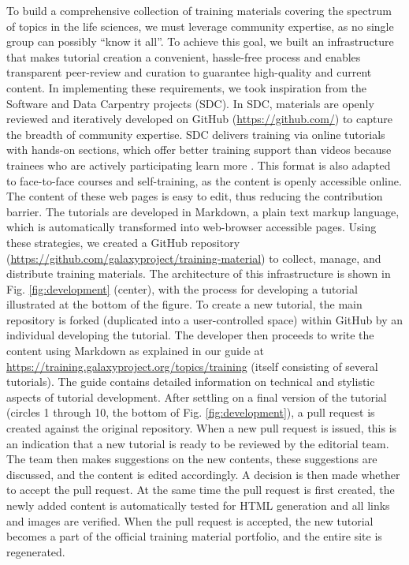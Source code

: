 To build a comprehensive collection of training materials covering the spectrum of topics in the life sciences, we must leverage community expertise, as no single group can possibly “know it all”. To achieve this goal, we built an infrastructure that makes tutorial creation a convenient, hassle-free process and enables transparent peer-review and curation to guarantee high-quality and current content. In implementing these requirements, we took inspiration from the Software and Data Carpentry \cite{wilson2014software} projects (SDC). In SDC, materials are openly reviewed and iteratively developed on GitHub (\url{https://github.com/}) to capture the breadth of community expertise. SDC delivers training via online tutorials with hands-on sections, which offer better training support than videos because trainees who are actively participating learn more \cite{dollar2007enhancing}.
This format is also adapted to face-to-face courses and self-training, as the content is openly accessible online. The content of these web pages is easy to edit, thus reducing the contribution barrier. The tutorials are developed in Markdown, a plain text markup language, which is automatically transformed into web-browser accessible pages. Using these strategies, we created a GitHub repository (\url{https://github.com/galaxyproject/training-material}) to collect, manage, and distribute training materials.
The architecture of this infrastructure is shown in Fig. \ref{fig:development} (center), with the process for developing a tutorial illustrated at the bottom of the figure. To create a new tutorial, the main repository is forked (duplicated into a user-controlled space) within GitHub by an individual developing the tutorial. The developer then proceeds to write the content using Markdown as explained in our guide at \url{https://training.galaxyproject.org/topics/training} (itself consisting of several tutorials). The guide contains detailed information on technical and stylistic aspects of tutorial development.
After settling on a final version of the tutorial (circles 1 through 10, the bottom of Fig. \ref{fig:development}), a pull request is created against the original repository. When a new pull request is issued, this is an indication that a new tutorial is ready to be reviewed by the editorial team. The team then makes suggestions on the new contents, these suggestions are discussed, and the content is edited accordingly. A decision is then made whether to accept the pull request. At the same time the pull request is first created, the newly added content is automatically tested for HTML generation and all links and images are verified. When the pull request is accepted, the new tutorial becomes a part of the official training material portfolio, and the entire site is regenerated.

